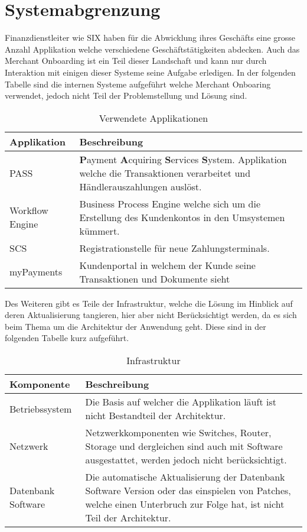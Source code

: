 \section{Systemabgrenzung}
\label{Abgrenzung}

Finanzdienstleiter wie SIX haben für die Abwicklung ihres Geschäfts eine grosse Anzahl Applikation welche verschiedene Geschäftstätigkeiten abdecken. Auch das Merchant Onboarding ist ein Teil dieser Landschaft und kann nur durch Interaktion mit einigen dieser Systeme seine Aufgabe erledigen. In der folgenden Tabelle sind die internen Systeme aufgeführt welche Merchant Onboaring verwendet, jedoch nicht Teil der Problemstellung und Lösung sind.
\begin{table}[H]
	\centering
	\caption{Verwendete Applikationen}
	\begin{tabular}{ | p{3cm} | p{12cm} | }
		\toprule
		{\textbf{Applikation}} & {\textbf{Beschreibung}} \\
		\midrule
		PASS & \textbf{P}ayment \textbf{A}cquiring \textbf{S}ervices \textbf{S}ystem. Applikation welche die Transaktionen verarbeitet und Händlerauszahlungen auslöst. \\ \hline
		Workflow Engine & Business Process Engine welche sich um die Erstellung des Kundenkontos in den Umsystemen kümmert.\\ \hline
		SCS & Registrationstelle für neue Zahlungsterminals.\\ \hline
		myPayments & Kundenportal in welchem der Kunde seine Transaktionen und Dokumente sieht \\
		\bottomrule
	\end{tabular}
\end{table}
Des Weiteren gibt es Teile der Infrastruktur, welche die Lösung im Hinblick auf deren Aktualisierung tangieren, hier aber nicht Berücksichtigt werden, da es sich beim Thema um die Architektur der Anwendung geht. Diese sind in der folgenden Tabelle kurz aufgeführt.

\begin{table}[H]
	\centering
	\caption{Infrastruktur}
	\begin{tabular}{ | p{3cm} | p{12cm} | }
		\toprule
		{\textbf{Komponente}} & {\textbf{Beschreibung}} \\
		\midrule
		Betriebssystem & Die Basis auf welcher die Applikation läuft ist nicht Bestandteil der Architektur. \\ \hline
		Netzwerk & Netzwerkkomponenten wie Switches, Router, Storage und dergleichen sind auch mit Software ausgestattet, werden jedoch nicht berücksichtigt.\\ \hline
		Datenbank Software & Die automatische Aktualisierung der Datenbank Software Version oder das einspielen von Patches, welche einen Unterbruch zur Folge hat, ist nicht Teil der Architektur. \\
		\bottomrule
	\end{tabular}
\end{table}

